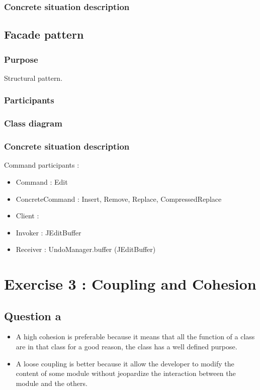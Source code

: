 \documentclass[a4paper,10pt]{article}
\begin{document}
\subsubsection{Concrete situation description}


\subsection{Facade pattern}
\subsubsection{Purpose}
Structural pattern.
\subsubsection{Participants}

\subsubsection{Class diagram}

\subsubsection{Concrete situation description}

Command participants :
\begin{itemize}
\item Command : Edit
\item ConcreteCommand : Insert, Remove, Replace, CompressedReplace
\item Client :
\item Invoker : JEditBuffer
\item Receiver : UndoManager.buffer (JEditBuffer)
\end{itemize}
\section{Exercise 3 : Coupling and Cohesion}
\subsection{Question a}
\begin{itemize}
\item A high cohesion is preferable because it means that all the function of a class are in that class for a good reason, the class has a well defined purpose.
\item A loose coupling is better because it allow the developer to modify the content of some module without jeopardize the interaction between the module and the others.
\end{itemize}
\end{document}
